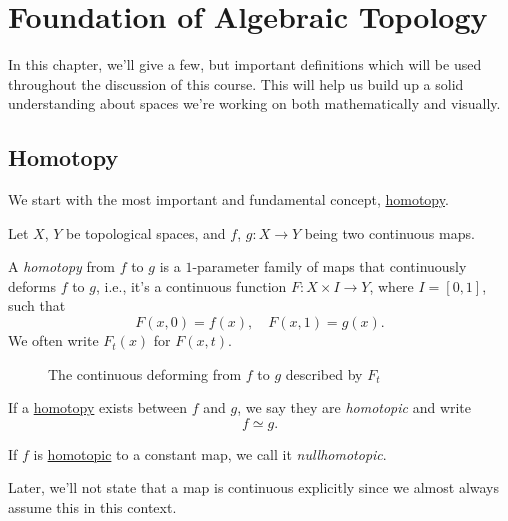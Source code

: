 \chapter{Foundation of Algebraic Topology}
In this chapter, we'll give a few, but important definitions which will be used throughout the
discussion of this course. This will help us build up a solid understanding about spaces
we're working on both mathematically and visually.
\section{Homotopy}
We start with the most important and fundamental concept, \hyperref[def:homotopy]{homotopy}.
\begin{definition*}
	Let \(X\), \(Y\) be topological spaces, and \(f\), \(g\colon X\to Y\) being two continuous maps.
	\begin{definition}[Homotopy]\label{def:homotopy}
		A \emph{homotopy} from \(f\) to \(g\) is a \(1\)-parameter family of maps that continuously deforms \(f\) to \(g\), i.e., it's a continuous function
		\(F\colon X\times I\to Y\), where \(I=\left[0,1\right]\), such that
		\[
			F(x, 0) = f(x),\quad F(x, 1) = g(x).
		\]
		We often write \(F_{t}(x)\) for \(F(x, t)\).
		\begin{figure}[H]
			\centering
			\caption{The continuous deforming from \(f\) to \(g\) described by \(F_t\)}
			\label{fig:def:homotopy}
		\end{figure}
	\end{definition}
	\begin{definition}[Homotopic]\label{def:homotopic}
		If a \hyperref[def:homotopy]{homotopy} exists between \(f\) and \(g\), we say they are \emph{homotopic} and write
		\[
			f\simeq g.
		\]
	\end{definition}
	\begin{definition}[Nullhomotopic]\label{def:nullhomotopic}
		If \(f\) is \hyperref[def:homotopic]{homotopic} to a constant map, we call it \emph{nullhomotopic}.
	\end{definition}

\end{definition*}

\begin{remark}
	Later, we'll not state that a map is continuous explicitly since we almost always assume this in this context.
\end{remark}

